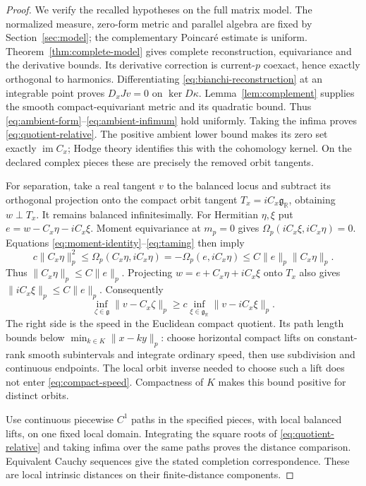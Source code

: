 \documentclass[11pt]{amsart}
\theoremstyle{definition}
\theoremstyle{remark}
\newcommand{\RR}{\mathbb R}
\newcommand{\im}{\operatorname{im}}
\begin{document}
\begin{proof}
We verify the recalled hypotheses on the full matrix model. The normalized
measure, zero-form metric and parallel algebra are fixed by
Section~\ref{sec:model}; the complementary Poincar\'e estimate is
uniform. Theorem~\ref{thm:complete-model} gives complete reconstruction,
equivariance and the derivative bounds. Its derivative correction is
current-$p$ coexact, hence exactly orthogonal to harmonics. Differentiating
\eqref{eq:bianchi-reconstruction} at an integrable point proves
$D_xJv=0$ on $\ker D\kappa$. Lemma~\ref{lem:complement} supplies
the smooth compact-equivariant metric and its quadratic bound.
Thus \eqref{eq:ambient-form}--\eqref{eq:ambient-infimum} hold uniformly.
Taking the infima proves \eqref{eq:quotient-relative}. The positive
ambient lower bound makes its zero set exactly $\im C_x$; Hodge
theory identifies this with the cohomology kernel. On the declared
complex pieces these are precisely the removed orbit tangents.

For separation, take a real tangent $v$ to the balanced locus and
subtract its orthogonal projection onto the compact orbit tangent
$T_x=iC_x\mathfrak g_{\RR}$, obtaining $w\perp T_x$.
It remains balanced infinitesimally. For Hermitian $\eta,\xi$ put
$e=w-C_x\eta-iC_x\xi$. Moment equivariance at $m_p=0$ gives
$\Omega_p(iC_x\xi,iC_x\eta)=0$. Equations
\eqref{eq:moment-identity}--\eqref{eq:taming} then imply
\[
 c\|C_x\eta\|_p^2
 \le\Omega_p(C_x\eta,iC_x\eta)
 =-\Omega_p(e,iC_x\eta)
 \le C\|e\|_p\|C_x\eta\|_p.
\]
Thus $\|C_x\eta\|_p\le C\|e\|_p$. Projecting
$w=e+C_x\eta+iC_x\xi$ onto $T_x$ also gives
$\|iC_x\xi\|_p\le C\|e\|_p$. Consequently
\begin{equation}\label{eq:compact-speed}
 \inf_{\zeta\in\mathfrak g}\|v-C_x\zeta\|_p
 \ge c\inf_{\xi\in\mathfrak g_{\RR}}\|v-iC_x\xi\|_p.
\end{equation}
The right side is the speed in the Euclidean compact quotient.
Its path length bounds below
$\min_{k\in K}\|x-ky\|_p$: choose horizontal compact lifts on
constant-rank smooth subintervals and integrate ordinary speed, then
use subdivision and continuous endpoints. The local orbit inverse
needed to choose such a lift does not enter \eqref{eq:compact-speed}.
Compactness of $K$ makes this bound positive for distinct orbits.

Use continuous piecewise $C^1$ paths in the specified pieces, with
local balanced lifts, on one fixed local domain. Integrating the
square roots of \eqref{eq:quotient-relative} and taking infima over
the same paths proves the distance comparison. Equivalent Cauchy
sequences give the stated completion correspondence. These are local
intrinsic distances on their finite-distance components.
\end{proof}
\end{document}
